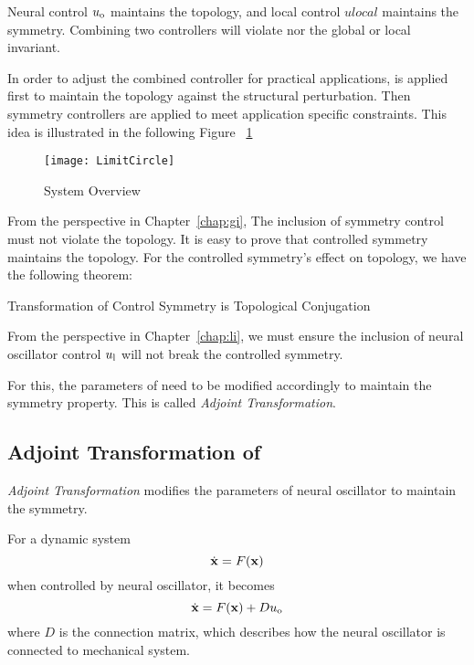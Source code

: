 Neural control $u_{\mathrm{o}}$ maintains the topology, and local control $ulocal$  maintains the symmetry.
Combining two controllers will violate nor the global or local invariant.

In order to adjust the combined controller for practical applications,
\cpg is applied first to maintain the topology against the structural perturbation. 
Then symmetry controllers are applied to meet application specific constraints.
This idea is illustrated in the following Figure ~\ref{fig:sysoverview}

\begin{figure}[!htbp]
  \begin{center}
      \texttt{[image: LimitCircle]}
    \caption{System Overview }
    \label{fig:sysoverview}
  \end{center}
\end{figure}





From the perspective in Chapter~\ref{chap:gi},
The inclusion of symmetry control must not violate the topology. 
It is easy to prove that controlled symmetry maintains the topology.
For the controlled symmetry's effect on topology, we have the following theorem:

\begin{mythe}
Transformation of Control Symmetry is Topological Conjugation
\end{mythe}


From the perspective in Chapter~\ref{chap:li},
we must ensure the inclusion of neural oscillator control $u_{\mathrm{l}}$ will not break the controlled symmetry.


For this, the parameters of \cpg need to be modified accordingly to maintain the symmetry property.
This is called \emph{Adjoint Transformation}.









\subsection{Adjoint Transformation of \cpg}
\emph{Adjoint Transformation} modifies the parameters of neural oscillator to maintain the symmetry.

For a dynamic system 
\[
\dot{\mathbf{x}}=F(\mathbf{x})
\]
when controlled by neural oscillator, it becomes 
\begin{equation}
\label{eq:gc}
\dot{\mathbf{x}}=F(\mathbf{x})+Du_{\mathrm{o}}
\end{equation}
where $D$ is the connection matrix, which describes how the neural oscillator is connected to mechanical system.


